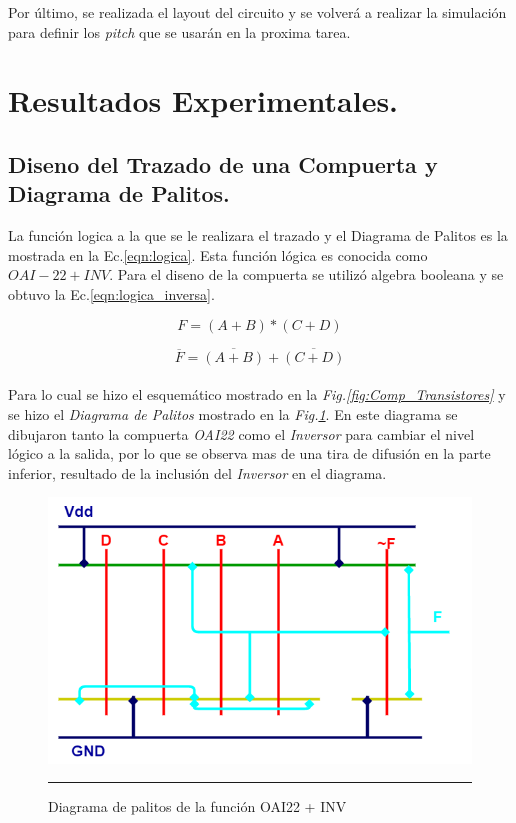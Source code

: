 \documentclass[12pt,a4paper]{article} %
\begin{document}
Por último, se realizada el layout del circuito y se volverá a realizar la simulación para definir los \textit{pitch} que se usarán en la proxima tarea.

\section{Resultados Experimentales.}


\subsection{Diseno del Trazado de una Compuerta y Diagrama de Palitos.}


La función logica a la que se le realizara el trazado y el Diagrama de Palitos es la mostrada en la Ec.\ref{eqn:logica}. Esta función lógica es conocida como $OAI-22 + INV.$ Para el diseno de la compuerta se utilizó algebra booleana y se obtuvo la Ec.\ref{eqn:logica_inversa}.

\begin{equation}\label{eqn:logica}
F=(A+B)*(C+D)
\end{equation}

\begin{equation}\label{eqn:logica_inversa}
\overline{F}=\overline{(A+B)}+\overline{(C+D)}
\end{equation}\\


Para lo cual se hizo el esquemático mostrado en la \textit{Fig.\ref{fig:Comp_Transistores}} y se hizo el \textit{Diagrama de Palitos} mostrado en la \textit{Fig.\ref{fig:inv_est}}. En este diagrama se dibujaron tanto la compuerta \textit{OAI22} como el \textit{Inversor} para cambiar el nivel lógico a la salida, por lo que se observa mas de una tira de difusión en la parte inferior, resultado de la inclusión del \textit{Inversor} en el diagrama.\\

\begin{figure}[htbp]
  \centering
    \includegraphics[scale=0.4]{./Palitos.png}
    \rule{35em}{0.5pt}
  \caption[IdealvsSim]{Diagrama de palitos de la función OAI22 + INV}
  \label{fig:inv_est}
\end{figure}
\end{document}
